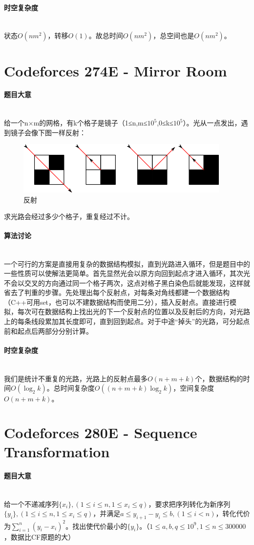 \documentclass[UTF8]{ctexart}
\newcommand{\myparagraph}[1]{\paragraph{#1}\mbox{}\\}
\theoremstyle{nonumberplain}
\begin{document}
		\myparagraph{时空复杂度}
		
			状态$O(nm^2)$，转移$O(1)$。故总时间$O(nm^2)$，总空间也是$O(nm^2)$。
	
	\section{Codeforces 274E - Mirror Room}
		
		\myparagraph{题目大意}
			
			给一个n×m的网格，有k个格子是镜子（1≤n,m≤$10^5$,0≤k≤$10^5$）。光从一点发出，遇到镜子会像下图一样反射：
			
			\begin{figure}[ht]
				\centering
				\includegraphics[width=\textwidth]{fig274e_1.png}
				\caption{反射}
			\end{figure}
			
			求光路会经过多少个格子，重复经过不计。
			
		\myparagraph{算法讨论}
		
			一个可行的方案是直接用复杂的数据结构模拟，直到光路进入循环，但是题目中的一些性质可以使解法更简单。首先显然光会以原方向回到起点才进入循环，其次光不会以交叉的方向通过同一个格子两次，这点对格子黑白染色后就能发现，这样就省去了判重的步骤。先处理出每个反射点，对每条对角线都建一个数据结构（C++可用set，也可以不建数据结构而使用二分），插入反射点。直接进行模拟，每次可在数据结构上找出光的下一个反射点的位置以及反射后的方向，对光路上的每条线段累加其长度即可，直到回到起点。对于中途“掉头”的光路，可分起点前和起点后两部分分别计算。
		
		\myparagraph{时空复杂度}
		
			我们是统计不重复的光路，光路上的反射点最多$O(n+m+k)$个，数据结构的时间$O(\log_2k)$。总时间复杂度$O((n+m+k)\log_2k)$，空间复杂度$O(n+m+k)$。
	
	\section{Codeforces 280E - Sequence Transformation}
	
		\myparagraph{题目大意}
		
			给一个不递减序列$\{x_i\},(1 \leq i \leq n, 1 \leq x_i \leq q)$，要求把序列转化为新序列$\{y_i\},(1 \leq i \leq n, 1 \leq x_i \leq q)$，并满足$a \leq y_{i+1}-y_i \leq b,(1 \leq i < n)$，转化代价为$\sum_{i=1}^n(y_i-x_i)^2$。找出使代价最小的$\{y_i\}$。（$1 \leq a,b,q \leq 10^9, 1 \leq n \leq 300000$，数据比CF原题的大）
		
\end{document}
